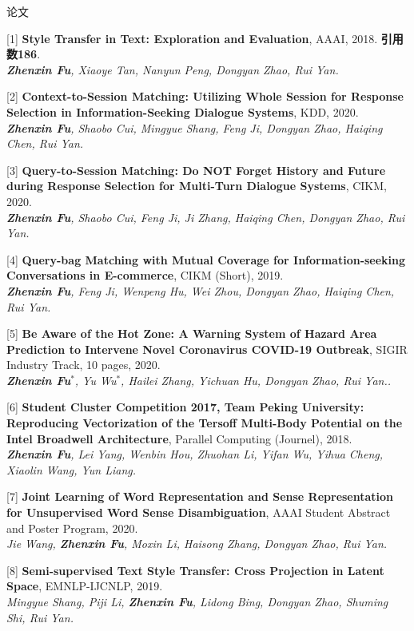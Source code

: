 \documentclass{resume} %
\begin{document}
\begin{rSection}{论文}
    
    [1] \textbf{Style Transfer in Text: Exploration and Evaluation}, AAAI, 2018. \textbf{引用数186}.\\
    {\it \textbf{Zhenxin Fu}, Xiaoye Tan, Nanyun Peng, Dongyan Zhao, Rui Yan.}
  
    [2] \textbf{Context-to-Session Matching: Utilizing Whole Session for Response Selection in Information-Seeking Dialogue Systems}, KDD, 2020. \\
    {\it \textbf{Zhenxin Fu}, Shaobo Cui, Mingyue Shang, Feng Ji, Dongyan Zhao, Haiqing Chen, Rui Yan.}

    [3] \textbf{Query-to-Session Matching: Do NOT Forget History and Future during Response Selection for Multi-Turn Dialogue Systems}, CIKM, 2020. \\
    {\it \textbf{Zhenxin Fu}, Shaobo Cui, Feng Ji, Ji Zhang, Haiqing Chen, Dongyan Zhao, Rui Yan.}
    
    [4] \textbf{Query-bag Matching with Mutual Coverage for Information-seeking Conversations in E-commerce}, CIKM (Short), 2019. \\
    {\it \textbf{Zhenxin Fu}, Feng Ji, Wenpeng Hu, Wei Zhou, Dongyan Zhao, Haiqing Chen, Rui Yan.}

    [5] \textbf{Be Aware of the Hot Zone: A Warning System of Hazard Area Prediction to Intervene Novel Coronavirus COVID-19 Outbreak}, SIGIR Industry Track, 10 pages, 2020. \\
    {\it \textbf{Zhenxin Fu}$^*$, Yu Wu$^*$, Hailei Zhang, Yichuan Hu, Dongyan Zhao, Rui Yan..}

    [6] \textbf{Student Cluster Competition 2017, Team Peking University: Reproducing Vectorization of the Tersoff Multi-Body Potential on the Intel Broadwell Architecture}, Parallel Computing (Journel), 2018. \\
    {\it \textbf{Zhenxin Fu}, Lei Yang, Wenbin Hou, Zhuohan Li, Yifan Wu, Yihua Cheng, Xiaolin Wang, Yun Liang.}

    [7] \textbf{Joint Learning of Word Representation and Sense Representation for Unsupervised Word Sense Disambiguation}, AAAI Student Abstract and Poster Program, 2020. \\
    {\it Jie Wang, \textbf{Zhenxin Fu}, Moxin Li, Haisong Zhang, Dongyan Zhao, Rui Yan.}

    [8] \textbf{Semi-supervised Text Style Transfer: Cross Projection in Latent Space}, EMNLP-IJCNLP, 2019. \\
    {\it Mingyue Shang, Piji Li, \textbf{Zhenxin Fu}, Lidong Bing, Dongyan Zhao, Shuming Shi, Rui Yan.}


\end{rSection}
\end{document}
